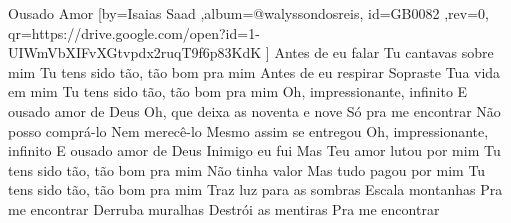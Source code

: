 \beginsong
{Ousado Amor %
}[by={Isaias Saad %
},album={@walyssondosreis},
id={GB0082 %
},rev={0}, %
qr={https://drive.google.com/open?id=1-UIWmVbXIFvXGtvpdx2ruqT9f6p83KdK %
}]
\beginverse*
Antes de eu falar
Tu cantavas sobre mim
Tu tens sido tão, tão bom pra mim
Antes de eu respirar
Sopraste Tua vida em mim
Tu tens sido tão, tão bom pra mim
\endverse
\beginchorus
Oh, impressionante, infinito
E ousado amor de Deus
Oh, que deixa as noventa e nove
Só pra me encontrar
Não posso comprá-lo
Nem merecê-lo
Mesmo assim se entregou
Oh, impressionante, infinito
E ousado amor de Deus
\endchorus
\beginverse*
Inimigo eu fui
Mas Teu amor lutou por mim
Tu tens sido tão, tão bom pra mim
Não tinha valor
Mas tudo pagou por mim
Tu tens sido tão, tão bom pra mim
\endverse
\beginverse*
Traz luz para as sombras
Escala montanhas
Pra me encontrar
Derruba muralhas
Destrói as mentiras
Pra me encontrar
\endverse

\begin{comment}
\lstset{basicstyle=\scriptsize\bf} %
\tab{Solo 1}
\begin{lstlisting}
E|-----------------------------------------------------|
B|-----------------------------------------------------|
G|-----------------------------------------------------|
D|-----------------------------------------------------|
A|-----------------------------------------------------|
E|-----------------------------------------------------|
\end{lstlisting}
\end{comment}
 

